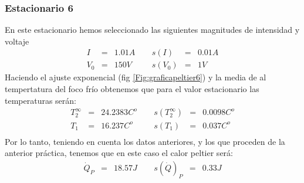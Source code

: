 \documentclass[12pt,a4paper]{article}
\begin{document}
\subsubsection{Estacionario 6}
En este estacionario hemos seleccionado las siguientes magnitudes de intensidad y voltaje  
\begin{equation} 
\begin{array}{lllllll}
I & = & 1.01 A & \ \ & s(I) & = & 0.01  A \\ 
 V_0 & = & 150 V & \ \ & s(V_0) & = & 1 V
\end{array} 
\end{equation} 
 Haciendo el ajuste exponencial (fig \ref{Fig:graficapeltier6}) y la media de al tempertatura del foco frío obtenemos que para el valor estacionario las temperaturas serán: 
\begin{equation} 
\begin{array}{lllllll}
T_2^{\infty} & = & 24.2383 C^o &  \ \ &  s(T_2^{\infty}) & =  & 0.0098  C^o \\ 
 T_1 & = & 16.237 C^o & \ \ & s(T_1) & = & 0.037  C^o \\ 
 \end{array} 
\end{equation} 
 Por lo tanto, teniendo en cuenta los datos anteriores, y los que proceden de la anterior práctica, tenemos que en este caso el calor peltier será: 
\begin{equation} 
\begin{array}{lllllll}
\dot{Q}_P & = & 18.57 J & \ \ & s(\dot{Q})_P & = & 0.33 J \\ 
\end{array} 
\end{equation} 
 
 
 
 
\end{document}

